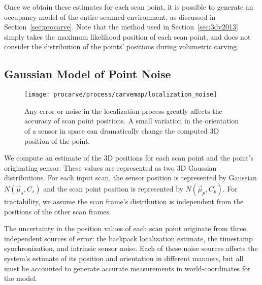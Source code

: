 \documentclass[12pt,onecolumn,oneside]{book}
\begin{document}
Once we obtain these estimates for each scan point, it is possible to generate an occupancy model of the entire scanned environment, as discussed in Section~\ref{sec:procarve}.  Note that the method used in Section~\ref{sec:3dv2013} simply takes the maximum likelihood position of each scan point, and does not consider the distribution of the points' positions during volumetric carving.

\subsection{Gaussian Model of Point Noise}
\label{ssec:point_noise_sources}

\begin{figure}[t]
	\centerline{\texttt{[image: procarve/process/carvemap/localization\_noise]}}
	
	\caption[Example of localization noise affecting point accuracy.]{Any error or noise in the localization process greatly affects the accuracy of scan point positions.  A small variation in the orientation of a sensor in space can dramatically change the computed 3D position of the point.}
	\label{fig:localization_noise}
\end{figure}

We compute an estimate of the 3D positions for each scan point and the point's originating sensor.  These values are represented as two 3D Gaussian distributions.  For each input scan, the sensor position is represented by Gaussian $N(\vec{\mu}_s,C_s)$ and the scan point position is represented by $N(\vec{\mu}_p,C_p)$.  For tractability, we assume the scan frame's distribution is independent from the positions of the other scan frames.

The uncertainty in the position values of each scan point originate from three independent sources of error: the backpack localization estimate, the timestamp synchronization, and intrinsic sensor noise.  Each of these noise sources affects the system's estimate of its position and orientation in different manners, but all must be accounted to generate accurate measurements in world-coordinates for the model.

\end{document}
